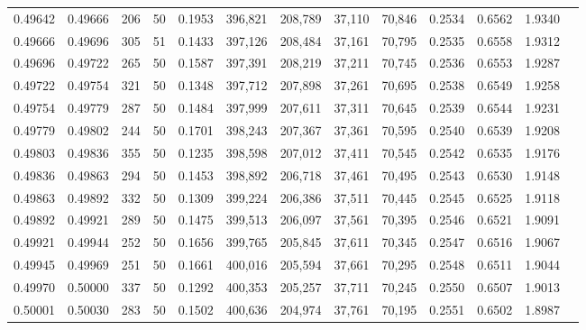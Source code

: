 \begin{tabular}{rrrrrrrrrrrrr}
0.49642 & 0.49666 &   206 &  50 &                                     0.1953 & 396,821 & 208,789 &  37,110 &  70,846 & 0.2534 & 0.6562 & 1.9340 \\
0.49666 & 0.49696 &   305 &  51 &                                     0.1433 & 397,126 & 208,484 &  37,161 &  70,795 & 0.2535 & 0.6558 & 1.9312 \\
0.49696 & 0.49722 &   265 &  50 &                                     0.1587 & 397,391 & 208,219 &  37,211 &  70,745 & 0.2536 & 0.6553 & 1.9287 \\
0.49722 & 0.49754 &   321 &  50 &                                     0.1348 & 397,712 & 207,898 &  37,261 &  70,695 & 0.2538 & 0.6549 & 1.9258 \\
0.49754 & 0.49779 &   287 &  50 &                                     0.1484 & 397,999 & 207,611 &  37,311 &  70,645 & 0.2539 & 0.6544 & 1.9231 \\
0.49779 & 0.49802 &   244 &  50 &                                     0.1701 & 398,243 & 207,367 &  37,361 &  70,595 & 0.2540 & 0.6539 & 1.9208 \\
0.49803 & 0.49836 &   355 &  50 &                                     0.1235 & 398,598 & 207,012 &  37,411 &  70,545 & 0.2542 & 0.6535 & 1.9176 \\
0.49836 & 0.49863 &   294 &  50 &                                     0.1453 & 398,892 & 206,718 &  37,461 &  70,495 & 0.2543 & 0.6530 & 1.9148 \\
0.49863 & 0.49892 &   332 &  50 &                                     0.1309 & 399,224 & 206,386 &  37,511 &  70,445 & 0.2545 & 0.6525 & 1.9118 \\
0.49892 & 0.49921 &   289 &  50 &                                     0.1475 & 399,513 & 206,097 &  37,561 &  70,395 & 0.2546 & 0.6521 & 1.9091 \\
0.49921 & 0.49944 &   252 &  50 &                                     0.1656 & 399,765 & 205,845 &  37,611 &  70,345 & 0.2547 & 0.6516 & 1.9067 \\
0.49945 & 0.49969 &   251 &  50 &                                     0.1661 & 400,016 & 205,594 &  37,661 &  70,295 & 0.2548 & 0.6511 & 1.9044 \\
0.49970 & 0.50000 &   337 &  50 &                                     0.1292 & 400,353 & 205,257 &  37,711 &  70,245 & 0.2550 & 0.6507 & 1.9013 \\
0.50001 & 0.50030 &   283 &  50 &                                     0.1502 & 400,636 & 204,974 &  37,761 &  70,195 & 0.2551 & 0.6502 & 1.8987 \\

\end{tabular}
